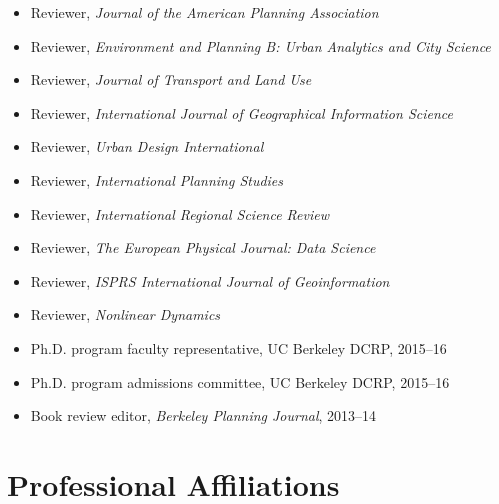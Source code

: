 \documentclass{academiccv}
\begin{document}
\begin{itemize}

\item Reviewer, \textit{Journal of the American Planning Association}

\item Reviewer, \textit{Environment and Planning B: Urban Analytics and City Science}

\item Reviewer, \textit{Journal of Transport and Land Use}

\item Reviewer, \textit{International Journal of Geographical Information Science}

\item Reviewer, \textit{Urban Design International}

\item Reviewer, \textit{International Planning Studies}

\item Reviewer, \textit{International Regional Science Review}

\item Reviewer, \textit{The European Physical Journal: Data Science}

\item Reviewer, \textit{ISPRS International Journal of Geoinformation}

\item Reviewer, \textit{Nonlinear Dynamics}

\item Ph.D. program faculty representative, UC Berkeley DCRP, 2015--16

\item Ph.D. program admissions committee, UC Berkeley DCRP, 2015--16

\item Book review editor, \textit{Berkeley Planning Journal}, 2013--14

\end{itemize}



\section*{Professional Affiliations}
\end{document}

